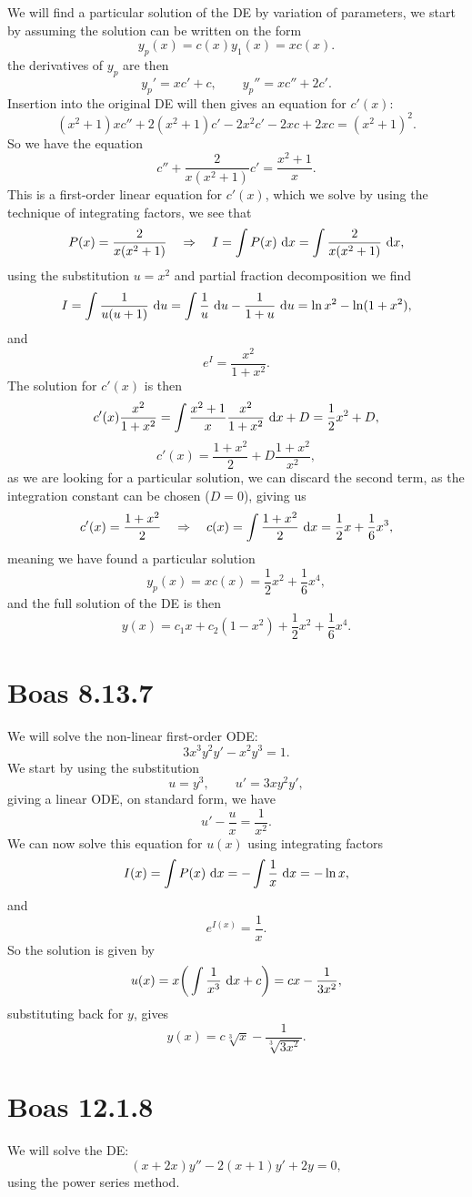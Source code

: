 \documentclass[a4paper, 11pt, titlepage, english]{article}
\renewcommand{\d}{{\rm d}}
\newcommand{\To}{\quad\Rightarrow\quad}
\begin{document}
We will find a particular solution of the DE by variation of parameters, we start by assuming the solution can be written on the form
$$y_p(x) = c(x)y_1(x) = xc(x).$$
the derivatives of $y_p$ are then
$$ y_p' = xc' + c, \qquad y_p'' = xc'' + 2c'.$$
Insertion into the original DE will then gives an equation for $c'(x)$:
$$(x^2+1)xc'' +2(x^2+1)c' - 2x^2c' - 2xc + 2xc = (x^2+1)^2.$$
So we have the equation
$$c'' + \frac{2}{x(x^2 + 1)}c' = \frac{x^2+1}{x}.$$
This is a first-order linear equation for $c'(x)$, which we solve by using the technique of integrating factors, we see that 
$$P(x) = \frac{2}{x(x^2+1)} \To I = \int P(x) \ \d x = \int \frac{2}{x(x^2+1)} \ \d x,$$
using the substitution $u = x^2$ and partial fraction decomposition we find
$$I = \int \frac{1}{u(u+1)} \ \d u = \int \frac{1}{u} \ \d u - \frac{1}{1+u} \ \d u = \ln x^2 - \ln (1+x^2),$$
and
$$e^I = \frac{x^2}{1+x^2}.$$
The solution for $c'(x)$ is then
$$c'(x) \frac{x^2}{1+x^2} = \int \frac{x^2+1}{x} \frac{x^2}{1+x^2} \ \d x + D = \frac{1}{2}x^2 + D,$$
$$c'(x) = \frac{1+x^2}{2} + D\frac{1+x^2}{x^2},$$
as we are looking for a particular solution, we can discard the second term, as the integration constant can be chosen ($D=0$), giving us
$$c'(x) = \frac{1+x^2}{2} \To c(x) = \int \frac{1+x^2}{2}\ \d x = \frac{1}{2}x + \frac{1}{6}x^3,$$
meaning we have found a particular solution
$$y_p(x) = xc(x) = \frac{1}{2}x^2 + \frac{1}{6}x^4,$$
and the full solution of the DE is then
$$y(x) = c_1 x + c_2(1-x^2) + \frac{1}{2}x^2 + \frac{1}{6}x^4.$$

\clearpage

\section*{Boas 8.13.7}
We will solve the non-linear first-order ODE:
$$3x^3y^2y' - x^2y^3 = 1.$$
We start by using the substitution
$$u = y^3, \qquad u' = 3xy^2y',$$
giving a linear ODE, on standard form, we have
$$u' - \frac{u}{x} = \frac{1}{x^2}.$$
We can now solve this equation for $u(x)$ using integrating factors
$$I(x) = \int P(x) \ \d x = - \int \frac{1}{x} \ \d x = -\ln x,$$
and
$$e^{I(x)} = \frac{1}{x}.$$
So the solution is given by
$$u(x) = x\bigg(\int \frac{1}{x^3} \ \d x + c\bigg) = cx - \frac{1}{3x^2},$$
substituting back for $y$, gives
$$y(x) = c\sqrt[3]{x} - \frac{1}{\sqrt[3]{3x^2}}.$$

\clearpage

\section*{Boas 12.1.8}
We will solve the DE:
$$(x+2x)y'' - 2(x+1)y' + 2y = 0,$$
using the power series method.
\end{document}
